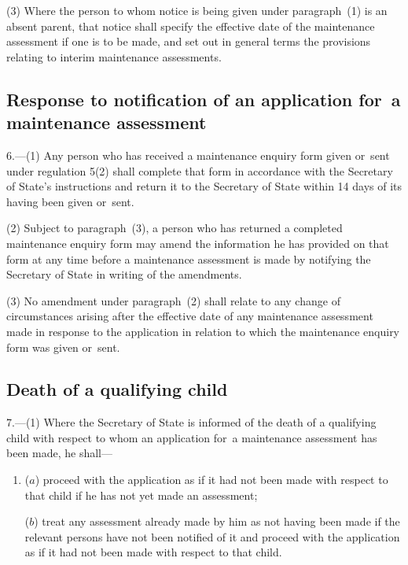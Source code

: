 \documentclass[a4paper,12pt]{article}
\begin{document}
(3) Where the person to whom notice is being given under paragraph~(1) is an absent parent, that notice shall specify the effective date of the maintenance assessment if one is to be made, and set out in general terms the provisions relating to interim maintenance assessments.


\subsection[6. Response to notification of an application for~a maintenance assessment]{\sloppy Response to notification of an application for~a maintenance assessment}

6.—(1) Any person who has received a maintenance enquiry form given or~sent under regulation 5(2) shall complete that form in accordance with the Secretary of State’s instructions and return it to the Secretary of State within 14 days of its having been given or~sent.

(2) Subject to paragraph~(3), a person who has returned a completed maintenance enquiry form may amend the information he has provided on that form at any time before a maintenance assessment is made by notifying the Secretary of State in writing of the amendments.

(3) No amendment under paragraph~(2) shall relate to any change of circumstances arising after the effective date of any maintenance assessment made in response to the application in relation to which the maintenance enquiry form was given or~sent.

\subsection[7. Death of a qualifying child]{Death of a qualifying child}

7.—(1) Where 
the Secretary of State  %
is informed of the death of a qualifying child with respect to whom an application for~a maintenance assessment has been made, he shall—
\begin{enumerate}\item[]
($a$) proceed with the application as if it had not been made with respect to that child if he has not yet made an assessment;

($b$) treat any assessment already made by him as not having been made if the relevant persons have not been notified of it and proceed with the application as if it had not been made with respect to that child.
\end{enumerate}
\end{document}
